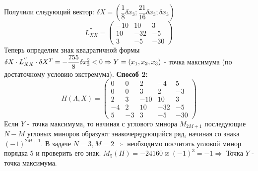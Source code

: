 \documentclass[12pt]{article}
\begin{document}
\begin{enumerate}
\begin{equation}
\end{equation}
Получили следующий вектор: $\delta X=(\dfrac{1}{8}\delta x_3;\dfrac{21}{16}\delta x_3;\delta x_3)$
\begin{equation}
  L_{XX}^{''}=\begin{pmatrix}
    -10&10&3\\10&-32&-5\\3&-5&-30
  \end{pmatrix}
\end{equation}
Теперь определим знак квадратичной формы $\delta X \cdot L_{XX}^{''} \cdot \delta X^T=-\dfrac{755}{8}\delta x_3^2<0\\
\Rightarrow Y=(x_1,x_2,x_3)$ - точка максимума (по достаточному условию экстремума).
\textbf{Способ 2:}
\begin{equation}
  H(\Lambda, X)=\begin{pmatrix}
    0&0&2&-4&5\\0&0&3&2&-3\\2&3&-10&10&3\\-4&2&10&-32&-5\\5&-3&3&-5&-30
  \end{pmatrix}
\end{equation}
Если $Y$ - точка максимума, то начиная с углового минора $M_{2M+1}$ последующие $N-M$ угловых миноров образуют знакочередующийся ряд, начиная со знака $(-1)^{2M+1}$.
В задаче $N=3,M=2\Rightarrow$ необходимо посчитать угловой минор порядка 5 и проверить его знак. $M_5(H)=-24160$ и $(-1)^3=-1\Rightarrow$
Точка $Y$ - точка максимума.


\end{enumerate}
\end{document}
